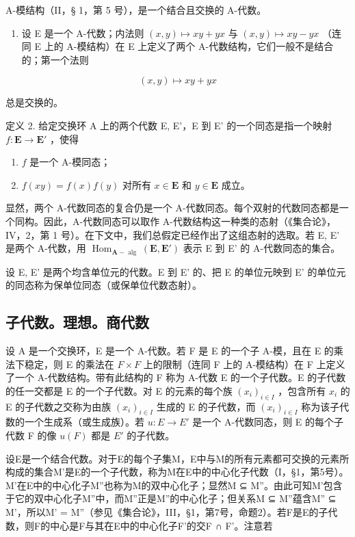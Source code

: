 A-模结构（II，§ 1，第 5 号），是一个结合且交换的 A-代数。

\begin{enumerate}
\def\labelenumi{(\arabic{enumi})}
\setcounter{enumi}{3}
\tightlist
\item
  设 E 是一个 A-代数；内法则 \((x,y)\mapsto xy+yx\) 与 \((x,y)\mapsto xy-yx\) （连同 E 上的 A-模结构）在 E 上定义了两个 A-代数结构，它们一般不是结合的；第一个法则
\end{enumerate}

\[
(x, y) \mapsto x y + y x
\]

总是交换的。

定义 2. 给定交换环 A 上的两个代数 E, E'，E 到 E' 的一个同态是指一个映射 \(f: \mathbf{E} \to \mathbf{E}'\) ，使得

\begin{enumerate}
\def\labelenumi{(\arabic{enumi})}
\item
  \(f\) 是一个 A-模同态；
\item
  \(f(xy) = f(x)f(y)\) 对所有 \(x \in \mathbf{E}\) 和 \(y \in \mathbf{E}\) 成立。
\end{enumerate}

显然，两个 A-代数同态的复合仍是一个 A-代数同态。每个双射的代数同态都是一个同构。因此，A-代数同态可以取作 A-代数结构这一种类的态射（《集合论》，IV，2，第 1 号）。在下文中，我们总假定已经作出了这组态射的选取。若 E, E' 是两个 A-代数，用 \(\operatorname{Hom}_{\mathbf{A}-\operatorname{alg}}(\mathbf{E}, \mathbf{E}')\) 表示 E 到 E' 的 A-代数同态的集合。

设 E, E' 是两个均含单位元的代数。E 到 E' 的、把 E 的单位元映到 E' 的单位元的同态称为保单位同态（或保单位代数态射）。

\subsection{子代数。理想。商代数}

设 A 是一个交换环，E 是一个 A-代数。若 F 是 E 的一个子 A-模，且在 E 的乘法下稳定，则 E 的乘法在 \(F \times F\) 上的限制（连同 F 上的 A-模结构）在 F 上定义了一个 A-代数结构。带有此结构的 F 称为 A-代数 E 的一个子代数。E 的子代数的任一交都是 E 的一个子代数。对 E 的元素的每个族 \((x_{i})_{i \in I}\) ，包含所有 \(x_{i}\) 的 E 的子代数之交称为由族 \((x_{i})_{i \in I}\) 生成的 E 的子代数，而 \((x_{i})_{i \in I}\) 称为该子代数的一个生成系（或生成族）。若 \(u: E \to E'\) 是一个 A-代数同态，则 E 的每个子代数 F 的像 \(u(F)\) 都是 \(E'\) 的子代数。

设E是一个结合代数。对于E的每个子集M，E中与M的所有元素都可交换的元素所构成的集合M'是E的一个子代数，称为M在E中的中心化子代数（I，§1，第5号）。M'在E中的中心化子M''也称为M的双中心化子；显然M ⊆ M''。由此可知M'包含于它的双中心化子M''中，而M''正是M''的中心化子；但关系M ⊆ M''蕴含M'' ⊆ M'，所以M' = M''（参见《集合论》，III，§1，第7号，命题2）。若F是E的子代数，则F的中心是F与其在E中的中心化子F'的交F ∩ F'。注意若

